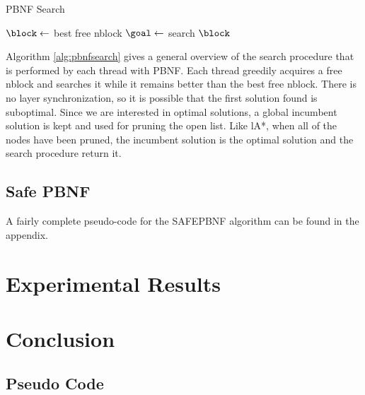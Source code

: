 \documentclass{article}
\begin{document}
\begin{algorithm}
  \caption{PBNF Search}
  \label{alg:pbnfsearch}
   {
    $\block \leftarrow$ best free nblock\;
     {
      $\goal \leftarrow$ search $\block$\;
    }
  }
\end{algorithm}

Algorithm \ref{alg:pbnfsearch} gives a general overview of the search
procedure that is performed by each thread with PBNF.  Each thread
greedily acquires a free nblock and searches it while it remains
better than the best free nblock.  There is no layer synchronization,
so it is possible that the first solution found is suboptimal.  Since
we are interested in optimal solutions, a global incumbent solution is
kept and used for pruning the open list.  Like lA*, when all of the
nodes have been pruned, the incumbent solution is the optimal solution
and the search procedure return it.

\subsection{Safe PBNF}

A fairly complete pseudo-code for the SAFEPBNF algorithm can be found
in the appendix.

\section{Experimental Results}

\section{Conclusion}




\begin{appendices}
\section{Pseudo Code}

\end{appendices}
\end{document}
